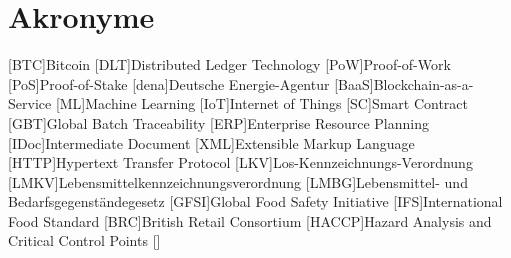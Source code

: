 \section*{Akronyme}            %
\begin{acronym}[HACCP]
	[BTC]{Bitcoin}
	[DLT]{Distributed Ledger Technology}
	[PoW]{Proof-of-Work}
	[PoS]{Proof-of-Stake}
	[dena]{Deutsche Energie-Agentur}
	[BaaS]{Blockchain-as-a-Service}
	[ML]{Machine Learning}
	[IoT]{Internet of Things}
	[SC]{Smart Contract}
  [GBT]{Global Batch Traceability}
  [ERP]{Enterprise Resource Planning}
  [IDoc]{Intermediate Document}
  [XML]{Extensible Markup Language}
  [HTTP]{Hypertext Transfer Protocol}
  [LKV]{Los-Kennzeichnungs-Verordnung}
  [LMKV]{Lebensmittelkennzeichnungsverordnung}
  [LMBG]{Lebensmittel- und Bedarfsgegenständegesetz}
  [GFSI]{Global Food Safety Initiative}
  [IFS]{International Food Standard}
  [BRC]{British Retail Consortium}
  [HACCP]{Hazard Analysis and Critical Control Points}
  \acro{}[]{}
\end{acronym}

\newpage

\listoffigures
{}
\listoftables
{}
\newpage
